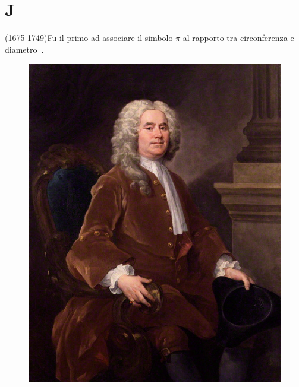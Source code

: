 \chapter{J}
\vspace{5mm}
(1675-1749)Fu il primo ad associare il simbolo $\pi$ al rapporto tra circonferenza e diametro\pointsto~.
\begin{figure}
	\centering{}
	\includegraphics[width=0.7\linewidth]{Figure/J/William_Jones,_the_Mathematician}
		\label{fig:williamjonesthemathematician}
\end{figure}
